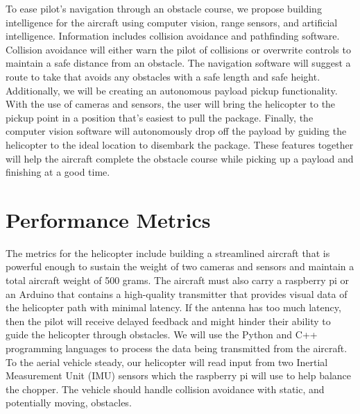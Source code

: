 \documentclass[onecolumn, draftclsnofoot,10pt, compsoc]{IEEEtran}
\begin{document}
To ease pilot’s navigation through an obstacle course, we propose building intelligence for the aircraft using computer vision, range sensors, and artificial intelligence. Information includes collision avoidance and pathfinding software. Collision avoidance will either warn the pilot of collisions or overwrite controls to maintain a safe distance from an obstacle. The navigation software will suggest a route to take that avoids any obstacles with a safe length and safe height. Additionally, we will be creating an autonomous payload pickup functionality. With the use of cameras and sensors, the user will bring the helicopter to the pickup point in a position that's easiest to pull the package. Finally, the computer vision software will autonomously drop off the payload by guiding the helicopter to the ideal location to disembark the package. These features together will help the aircraft complete the obstacle course while picking up a payload and finishing at a good time.

\section{Performance Metrics}
The metrics for the helicopter include building a streamlined aircraft that is powerful enough to sustain the weight of two cameras and sensors and maintain a total aircraft weight of 500 grams. The aircraft must also carry a raspberry pi or an Arduino that contains a high-quality transmitter that provides visual data of the helicopter path with minimal latency. If the antenna has too much latency, then the pilot will receive delayed feedback and might hinder their ability to guide the helicopter through obstacles. We will use the Python and C++  programming languages to process the data being transmitted from the aircraft. To the aerial vehicle steady, our helicopter will read input from two Inertial Measurement Unit (IMU) sensors which the raspberry pi will use to help balance the chopper. The vehicle should handle collision avoidance with static, and potentially moving, obstacles.
\end{document}
